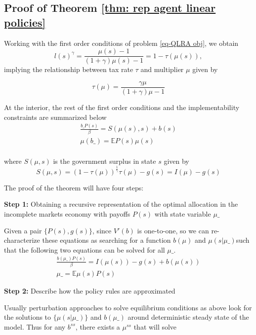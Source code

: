 \documentclass[thmsb,11pt]{article}
\newcommand{\EE}{\mathbb E}
\begin{document}
\newpage

\subsection{Proof of Theorem \protect\ref{thm: rep agent linear policies}}
\label{appndx: ergodic distribution linearization}
Working with the first order conditions of problem \ref{eq-QLRA obj}, we obtain
\[
	l(s)^\gamma = \frac{\mu(s)-1}{(1+\gamma)\mu(s) - 1} = 1-\tau(\mu(s)),
\]
implying the relationship between tax rate $\tau$ and multiplier $\mu$ given by

\begin{equation}\label{eq.tau}
	\tau(\mu) = \frac{\gamma\mu}{(1+\gamma)\mu-1}
\end{equation}

At the interior, the rest of the first order conditions  and the implementability constraints are summarized below
\begin{align*}
	\frac{b\_ P(s)}{\beta }= S(\mu(s),s) + b(s)\\
	\mu(b\_) = \EE P(s) \mu(s)\\
\end{align*}

where $S(\mu,s)$ is the government surplus in state $s$ given by
\[
	S(\mu,s) = (1-\tau(\mu))^\frac1\gamma \tau(\mu)-g(s) = I(\mu) - g(s)
\]


The proof of the theorem will have four steps:

\textbf{Step 1:} Obtaining a recursive representation of the optimal allocation in the incomplete markets economy with payoffs $P(s)$ with state variable $\mu\_$


Given a pair $\{P(s),g(s)\}$, since $V'(b)$ is one-to-one, so we can re-characterize these equations as searching for a function $b(\mu)$ and $\mu(s|\mu\_)$such that the following two equations can be solved for all $\mu\_$.
\begin{align}\label{eq.lin_imp}
	\frac{b(\mu\_)P(s)}{\beta } = I(\mu(s)) - g(s) +b(\mu(s))\\
	\mu\_ = \EE\mu(s)P(s)\label{eq.lin_mart}
\end{align}



\textbf{Step 2:} Describe how the policy rules are approximated

Usually perturbation approaches  to solve equilibrium conditions as above look for the solutions to $\{\mu(s|\mu\_)\}$ and $b(\mu\_)$ around deterministic steady state of the model. Thus for any $b^{ss}$, there exists a $\mu^{ss}$ that will solve
\end{document}
